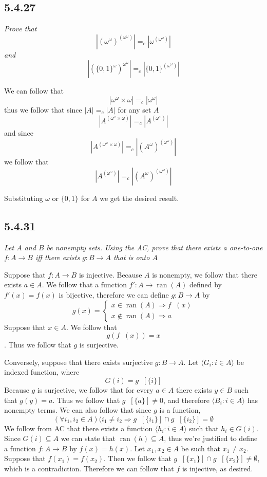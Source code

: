 \documentclass[11pt,oneside,titlepage]{book}
\DeclareMathOperator \inv {^{-1}}
\DeclareMathOperator \ra {\Rightarrow}
\DeclareMathOperator \ran {ran}
\newcommand{\eangle}[1]{\langle #1 \rangle}
\begin{document}
\subsection*{5.4.27}

\textit{Prove that
$$|(\omega^\omega)^{(\omega^\omega)}| =_c|\omega^{(\omega^\omega)}|$$
and
$$|(\{0, 1\}^\omega)^{\omega^\omega}| =_c|\{0, 1\}^{(\omega^\omega)}|$$
}

We can follow that $$|\omega^{\omega} \times \omega| =_c |\omega^\omega|$$
thus we follow that since $|A| =_c |A|$ for any set $A$
$$|A^{(\omega^{\omega} \times \omega)}| =_c |A^{(\omega^\omega)}|$$
and since
$$|A^{(\omega^{\omega} \times \omega)}| =_c  |(A^\omega)^{(\omega^{\omega})}|$$
we follow that
$$|A^{(\omega^\omega)}| =_c |(A^\omega)^{(\omega^{\omega})}|$$

Substituting $\omega$ or $\{0, 1\}$ for $A$ we get the desired result.

\subsection*{5.4.31}

\textit{Let $A$ and $B$ be nonempty sets. Using the AC, prove that there
  exists a one-to-one $f: A \to B$ iff there exists $g: B \to A$ that is
  onto $A$}

Suppose that $f: A \to B$ is injective. Because $A$ is nonempty, we follow that
there exists $a \in A$. We follow that
a function $f': A \to \ran(A)$ defined by $f'(x) = f(x)$ is bijective, therefore
we can define $g: B \to A$ by
$$g(x) =
\begin{cases}
  x \in \ran(A) \ra f\inv(x) \\
  x \notin \ran(A) \ra a
\end{cases}
$$
Suppose that $x \in A$. We follow that $$g(f\inv(x)) = x$$. Thus we follow that
$g$ is surjective.

Conversely,
suppose that there exists surjective  $g: B \to A$. 
Let $\eangle{G_i: i \in A}$ be indexed function, where
$$G(i) = g\inv[\{i\}] $$
Because $g$ is surjective, we follow that for every $a \in A$ there exists
$y \in B$ such that $g(y) = a$. 
Thus we follow that $g\inv[\{a\}] \neq 0$,
and therefore $\eangle{B_i: i \in A}$ has nonempty terms.
We can also follow that since $g$ is a function,
$$(\forall i_1, i_2 \in A)(i_1 \neq i_2 \ra g\inv[\{i_1\}] \cap g\inv[\{i_2\}] = \emptyset$$
We follow from AC
that there exists a function $\eangle{h_i: i \in A}$ such that $h_i \in G(i)$.
Since $G(i) \subseteq A$ we can state that $\ran(h) \subseteq A$, thus we're
justified to define a function $f: A \to B$ by $f(x) = h(x)$.
Let  $x_1, x_2 \in A$ be such that $x_1 \neq x_2$. Suppose that $f(x_1) = f(x_2)$.
Then we follow that $g\inv[\{x_1\}] \cap g\inv[\{x_2\}] \neq \emptyset$, which is a
contradiction. Therefore we can follow that $f$ is injective, as desired.
\end{document}
